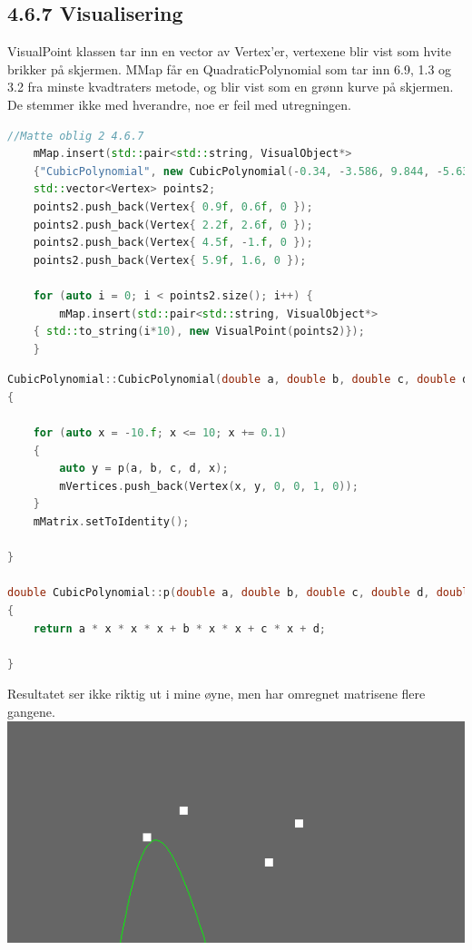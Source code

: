 \documentclass[a4paper,norsk]{article}
\begin{document}
\subsection{4.6.7 Visualisering}
VisualPoint klassen tar inn en vector av Vertex'er, vertexene blir vist som hvite brikker på skjermen. MMap får en QuadraticPolynomial som tar inn 6.9, 1.3 og 3.2 fra minste kvadtraters metode, og blir vist som en grønn kurve på skjermen.
De stemmer ikke med hverandre, noe er feil med utregningen.
\begin{lstlisting}[language=C++, caption={renderwindow.cpp}]
//Matte oblig 2 4.6.7
    mMap.insert(std::pair<std::string, VisualObject*>
	{"CubicPolynomial", new CubicPolynomial(-0.34, -3.586, 9.844, -5.634,0.1f)});
    std::vector<Vertex> points2;
    points2.push_back(Vertex{ 0.9f, 0.6f, 0 });
    points2.push_back(Vertex{ 2.2f, 2.6f, 0 });
    points2.push_back(Vertex{ 4.5f, -1.f, 0 });
    points2.push_back(Vertex{ 5.9f, 1.6, 0 });
    
    for (auto i = 0; i < points2.size(); i++) {
        mMap.insert(std::pair<std::string, VisualObject*>
	{ std::to_string(i*10), new VisualPoint(points2)});
    }
\end{lstlisting}
\begin{lstlisting}[language=C++, caption={cubicpolynomial.cpp}]
CubicPolynomial::CubicPolynomial(double a, double b, double c, double d, float dx)
{
   
    for (auto x = -10.f; x <= 10; x += 0.1)
    {
        auto y = p(a, b, c, d, x);
        mVertices.push_back(Vertex(x, y, 0, 0, 1, 0));
    }
    mMatrix.setToIdentity();

}

double CubicPolynomial::p(double a, double b, double c, double d, double x)
{
    return a * x * x * x + b * x * x + c * x + d;

}
\end{lstlisting}
Resultatet ser ikke riktig ut i mine øyne, men har omregnet matrisene flere gangene. 
\centering
\includegraphics[width=\textwidth]{MatteOblig2Kubiskinterpolasjon}
\end{document}
